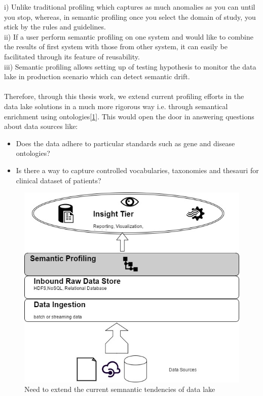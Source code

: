 i) Unlike traditional profiling which captures as much anomalies as you can until you stop, whereas, in semantic profiling once you select the domain of study, you stick by the rules and guidelines. \\
ii) If a user perform semantic profiling on one system and would like to combine the results of first system  with those from other system, it can easily be facilitated through its feature of reusability. \\
iii) Semantic profiling allows setting up of testing hypothesis to monitor the data lake in production scenario which can detect semantic drift.\\~\\
Therefore, through this thesis work, we extend current profiling efforts in the data lake solutions in a much more rigorous way i.e. through semantical enrichment using ontologies[\ref{fig:Figure1}]. This would open the door in answering questions about data sources like: 
\begin{itemize}
	\item Does the data adhere to particular standards such as gene and disease ontologies?
	\item  Is there a way to capture controlled vocabularies, taxonomies and thesauri for clinical dataset of patients?
\end{itemize}
\begin{figure}[htbp]
	\centering
	
	\includegraphics[scale=0.6]{./images/datalake.JPG}
	\caption{Need to extend the current semnantic tendencies of data lake}
	\label{fig:Figure1}
\end{figure}

